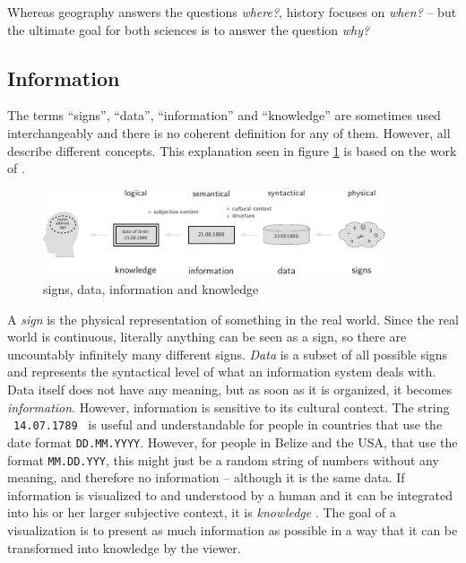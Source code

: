 Whereas geography answers the questions \emph{where?}, history focuses on \emph{when?} -- but the ultimate goal for both sciences is to answer the question \emph{why?}




\subsection{Information} %
\label{sub:information}

The terms ``signs'', ``data'', ``information'' and ``knowledge'' are sometimes used interchangeably and there is no coherent definition for any of them. However, all describe different concepts. This explanation seen in figure \ref{fig:information} is based on the work of \cite{datinfwis}.

\begin{figure}[ht]
  \vspace{1em}
  \begin{center}
    \includegraphics[width=0.9\textwidth]{graphics/basics/information}
  \end{center}
  \caption{signs, data, information and knowledge}
  \label{fig:information}
\end{figure}

A \emph{sign} is the physical representation of something in the real world. Since the real world is continuous, literally anything can be seen as a sign, so there are uncountably infinitely many different signs. \emph{Data} is a subset of all possible signs and represents the syntactical level of what an information system deals with. Data itself does not have any meaning, but as soon as it is organized, it becomes \emph{information}. However, information is sensitive to its cultural context. The string ~\texttt{14.07.1789}~ is useful and understandable for people in countries that use the date format \texttt{DD.MM.YYYY}. However, for people in Belize and the USA, that use the format \texttt{MM.DD.YYY}, this might just be a random string of numbers without any meaning, and therefore no information -- although it is the same data. If information is visualized to and understood by a human and it can be integrated into his or her larger subjective context, it is \emph{knowledge} \cite{nake}. The goal of a visualization is to present as much information as possible in a way that it can be transformed into knowledge by the viewer.

